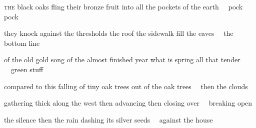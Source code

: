 
\begin{poem}
\begin{stanza}
\textsc{the} black oaks\verseline
fling their bronze fruit\verseline
into all the pockets of the earth\verseline
~~pock pock
\end{stanza}

\begin{stanza}
they knock against the thresholds\verseline
the roof the sidewalk\verseline
fill the eaves\verseline
~~the bottom line
\end{stanza}

\begin{stanza}
of the old gold song\verseline
of the almost finished year\verseline
what is spring all that tender\verseline
~~green stuff
\end{stanza}

\begin{stanza}
compared to this\verseline
falling of tiny oak trees\verseline
out of the oak trees\verseline
~~then the clouds
\end{stanza}

\begin{stanza}
gathering thick along the west\verseline
then advancing\verseline
then closing over\verseline
~~breaking open
\end{stanza}

\begin{stanza}
the silence\verseline
then the rain\verseline
dashing its silver seeds\verseline
~~against the house
\end{stanza}
\end{poem}